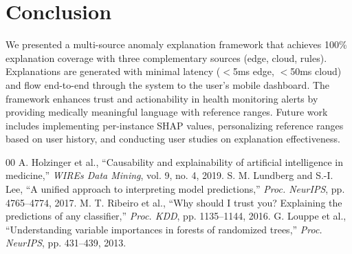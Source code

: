 \documentclass[conference]{IEEEtran}
\begin{document}
\section{Conclusion}
We presented a multi-source anomaly explanation framework that achieves 100\% explanation coverage with three complementary sources (edge, cloud, rules). Explanations are generated with minimal latency ($<$5ms edge, $<$50ms cloud) and flow end-to-end through the system to the user's mobile dashboard. The framework enhances trust and actionability in health monitoring alerts by providing medically meaningful language with reference ranges. Future work includes implementing per-instance SHAP values, personalizing reference ranges based on user history, and conducting user studies on explanation effectiveness.

\begin{thebibliography}{00}
 A. Holzinger et al., ``Causability and explainability of artificial intelligence in medicine,'' \textit{WIREs Data Mining}, vol. 9, no. 4, 2019.
 S. M. Lundberg and S.-I. Lee, ``A unified approach to interpreting model predictions,'' \textit{Proc. NeurIPS}, pp. 4765--4774, 2017.
 M. T. Ribeiro et al., ``Why should I trust you? Explaining the predictions of any classifier,'' \textit{Proc. KDD}, pp. 1135--1144, 2016.
 G. Louppe et al., ``Understanding variable importances in forests of randomized trees,'' \textit{Proc. NeurIPS}, pp. 431--439, 2013.
\end{thebibliography}
\end{document}
